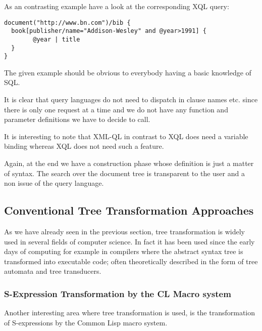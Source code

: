 \documentclass[a4paper,11pt]{scrartcl}
\begin{document}
As an contrasting example have a look at the corresponding XQL query:
\begin{verbatim}
document("http://www.bn.com")/bib { 
  book[publisher/name="Addison-Wesley" and @year>1991] {
        @year | title
  }
}
\end{verbatim}
The given example should be obvious to everybody having a basic
knowledge of SQL.

It is clear that query languages do not need to dispatch in clause
names etc. since there is only one request at a time and we do not
have any function and parameter definitions we have to decide to
call.

It is interesting to note that XML-QL in contrast to XQL does need a
variable binding whereas XQL does not need such a feature.

Again, at the end we have a construction phase whose definition is
just a matter of syntax. The search over the document tree is
transparent to the user and a non issue of the query language.

\subsection{Conventional Tree Transformation Approaches}
As we have already seen in the previous section, tree transformation
is widely used in several fields of computer science. In fact it
has been used since the early days of computing for example in
compilers where the abstract syntax tree is transformed into
executable code; often theoretically described in the form of tree
automata and tree transducers.

\subsubsection{S-Expression Transformation by the CL Macro system}
Another interesting area where tree transformation is used, is the
transformation of S-expressions by the Common Lisp macro system.
\\
\end{document}
